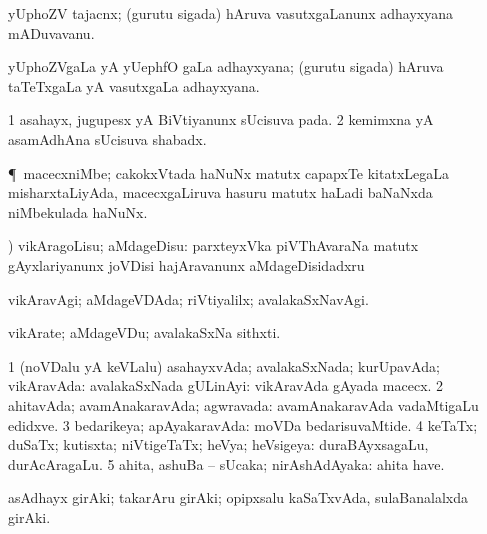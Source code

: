 \bentry
{} 
\gl{\nA}
\expl{}
\bmng
yUphoZV tajacnx; (gurutu sigada) hAruva vasutxgaLanunx adhayxyana mADuvavanu. 
\emng
\eentry

\bentry
{} 
\gl{\nA}
\expl{}
\bmng
yUphoZVgaLa yA yUephfO  gaLa adhayxyana; (gurutu sigada) hAruva taTeTxgaLa yA vasutxgaLa adhayxyana. 
\emng
\eentry

\bentry
{} 
\gl{\BAavayx}
\bmng
\bnum
\num{1} asahayx, jugupesx yA BiVtiyanunx sUcisuva pada. 
\num{2} kemimxna yA asamAdhAna sUcisuva shabadx. 
\enum
\emng
\eentry

\bentry
{} 
\gl{\nA}
\bmng
\P\ macecxniMbe; cakokxVtada haNuNx matutx capapxTe kitatxLegaLa misharxtaLiyAda, macecxgaLiruva hasuru matutx haLadi baNaNxda niMbekulada haNuNx. 
\emng
\eentry

\bentry
{} 
\gl{\sakirx}
) \bmng
vikAragoLisu; aMdageDisu:  parxteyxVka piVThAvaraNa matutx gAyxlariyanunx joVDisi hajAravanunx aMdageDisidadxru 
\emng
\eentry

\bentry
{} 
\gl{\kirxvi}
\expl{}
\bmng
vikAravAgi; aMdageVDAda; riVtiyalilx; avalakaSxNavAgi. 
\emng
\eentry

\bentry
{} 
\gl{\nA}
\expl{}
\bmng
vikArate; aMdageVDu; avalakaSxNa sithxti. 
\emng
\eentry

\bentry
{} 
\gl{\gu}
\bmng
\bnum
\num{1} (noVDalu yA keVLalu) asahayxvAda; avalakaSxNada; kurUpavAda; vikAravAda:  avalakaSxNada gULinAyi:  vikAravAda gAyada macecx. 
\num{2} ahitavAda; avamAnakaravAda; agwravada:  avamAnakaravAda vadaMtigaLu edidxve. 
\num{3} bedarikeya; apAyakaravAda:  moVDa bedarisuvaMtide. 
\num{4} keTaTx; duSaTx; kutisxta; niVtigeTaTx; heVya; heVsigeya:  duraBAyxsagaLu, durAcAragaLu. 
\num{5} ahita, ashuBa -- sUcaka; nirAshAdAyaka:  ahita have. 
\enum
\emng
\eentry

\bentry
{}
\gl{\nA}
\bmng
 asAdhayx girAki; takarAru girAki; opipxsalu kaSaTxvAda, sulaBanalalxda girAki. 
\emng
\eentry

